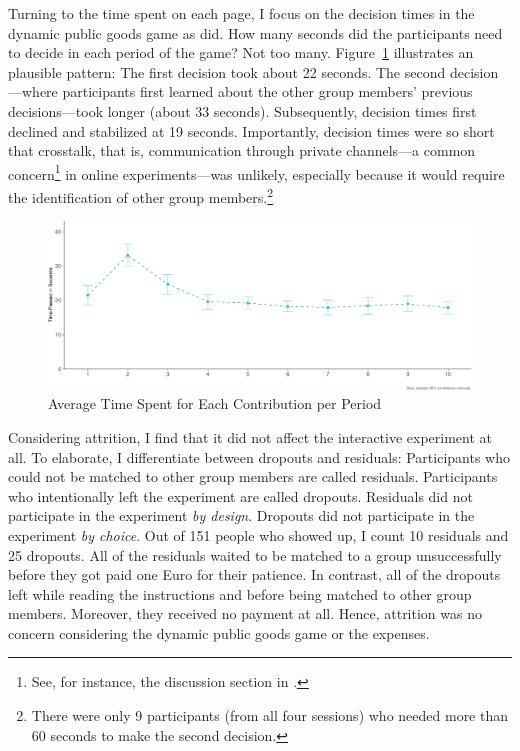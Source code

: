 \documentclass[
  authoryear,
  review,
  3p,
  onecolumn]{elsarticle}
\begin{document}
Turning to the time spent on each page, I focus on the decision times in
the dynamic public goods game as \citet{Anderhub2001} did. How many
seconds did the participants need to decide in each period of the game?
Not too many. Figure~\ref{fig-time-spent} illustrates an plausible
pattern: The first decision took about 22 seconds. The second
decision---where participants first learned about the other group
members' previous decisions---took longer (about 33 seconds).
Subsequently, decision times first declined and stabilized at 19
seconds. Importantly, decision times were so short that crosstalk, that
is, communication through private channels---a common concern\footnote{See,
  for instance, the discussion section in \citet[p.~119]{AGM2018}.} in
online experiments---was unlikely, especially because it would require
the identification of other group members.\footnote{There were only 9
  participants (from all four sessions) who needed more than 60 seconds
  to make the second decision.}

\begin{figure}

{\centering \includegraphics{paper_files/figure-pdf/fig-time-spent-1.pdf}

}

\caption{\label{fig-time-spent}Average Time Spent for Each Contribution
per Period}

\end{figure}

Considering attrition, I find that it did not affect the interactive
experiment at all. To elaborate, I differentiate between dropouts and
residuals: Participants who could not be matched to other group members
are called residuals. Participants who intentionally left the experiment
are called dropouts. Residuals did not participate in the experiment
\emph{by design}. Dropouts did not participate in the experiment
\emph{by choice}. Out of 151 people who showed up, I count 10 residuals
and 25 dropouts. All of the residuals waited to be matched to a group
unsuccessfully before they got paid one Euro for their patience. In
contrast, all of the dropouts left while reading the instructions and
before being matched to other group members. Moreover, they received no
payment at all. Hence, attrition was no concern considering the dynamic
public goods game or the expenses.
\end{document}
